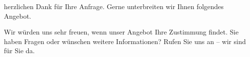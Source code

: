 \documentclass[11pt,ngerman,utf-8]{g-brief}
\begin{document}
\begin{g-brief}
herzlichen Dank f\"ur Ihre Anfrage.
Gerne unterbreiten wir Ihnen folgendes Angebot.

Wir w\"urden uns sehr freuen, wenn unser Angebot Ihre Zustimmung findet.
Sie haben Fragen oder w\"unschen weitere Informationen? Rufen Sie uns an – wir sind f\"ur Sie
da.

\end{g-brief}
\end{document}
